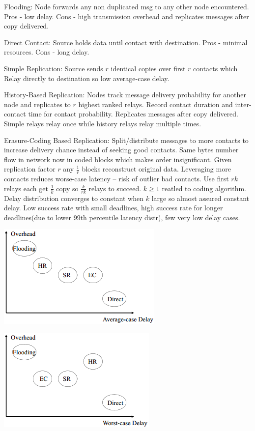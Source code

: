 \documentclass[9pt]{extarticle}
\begin{document}
\begin{multicols}{2}
Flooding: Node forwards any non duplicated msg to any other node encountered. Pros - low delay. Cons - high transmission overhead and replicates messages after copy delivered.

Direct Contact: Source holds data until contact with destination. Pros - minimal resources. Cons - long delay.

Simple Replication: Source sends $r$ identical copies over first $r$ contacts which Relay directly to destination so low average-case delay.

History-Based Replication: Nodes track message delivery probability for another node and replicates to $r$ highest ranked relays. Record contact duration and inter-contact time for contact probability. Replicates messages after copy delivered. Simple relays relay once while history relays relay multiple times.

Erasure-Coding Based Replication: Split/distribute messages to more contacts to increase delivery chance instead of seeking good contacts. Same bytes number flow in network now in coded blocks which makes order insignificant. Given replication factor $r$ any $\frac{1}{r}$ blocks reconstruct original data. Leveraging more contacts reduces worse-case latency – risk of outlier bad contacts. Use first $rk$ relays each get $\frac{1}{k}$ copy so $\frac{k}{rk}$ relays to succeed. $k\geq{1}$ reatled to coding algorithm. Delay distribution converges to constant when $k$ large so almost assured constant delay. Low success rate with small deadlines, high success rate for longer deadlines(due to lower 99th percentile latency distr), few very low delay cases.

\includegraphics{dtnsummary1.png}

\includegraphics{dtnsummary2.png}


\end{multicols}
\end{document}
